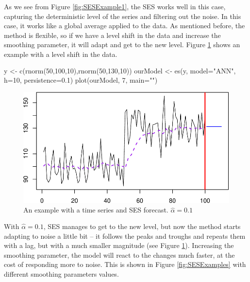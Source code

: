 \documentclass[
]{book}
\newenvironment{Shaded}{\begin{snugshade}}{\end{snugshade}}
\newcommand{\AttributeTok}[1]{\textcolor[rgb]{0.77,0.63,0.00}{#1}}
\newcommand{\DecValTok}[1]{\textcolor[rgb]{0.00,0.00,0.81}{#1}}
\newcommand{\FloatTok}[1]{\textcolor[rgb]{0.00,0.00,0.81}{#1}}
\newcommand{\FunctionTok}[1]{\textcolor[rgb]{0.00,0.00,0.00}{#1}}
\newcommand{\NormalTok}[1]{#1}
\newcommand{\OtherTok}[1]{\textcolor[rgb]{0.56,0.35,0.01}{#1}}
\newcommand{\StringTok}[1]{\textcolor[rgb]{0.31,0.60,0.02}{#1}}
\theoremstyle{definition}
\theoremstyle{definition}
\theoremstyle{definition}
\theoremstyle{definition}
\theoremstyle{remark}
\begin{document}
As we see from Figure \ref{fig:SESExample1}, the SES works well in this case, capturing the deterministic level of the series and filtering out the noise. In this case, it works like a global average applied to the data. As mentioned before, the method is flexible, so if we have a level shift in the data and increase the smoothing parameter, it will adapt and get to the new level. Figure \ref{fig:SESExample2} shows an example with a level shift in the data.

\begin{Shaded}
\begin{Highlighting}[]
\NormalTok{y }\OtherTok{\textless{}{-}} \FunctionTok{c}\NormalTok{(}\FunctionTok{rnorm}\NormalTok{(}\DecValTok{50}\NormalTok{,}\DecValTok{100}\NormalTok{,}\DecValTok{10}\NormalTok{),}\FunctionTok{rnorm}\NormalTok{(}\DecValTok{50}\NormalTok{,}\DecValTok{130}\NormalTok{,}\DecValTok{10}\NormalTok{))}
\NormalTok{ourModel }\OtherTok{\textless{}{-}} \FunctionTok{es}\NormalTok{(y, }\AttributeTok{model=}\StringTok{"ANN"}\NormalTok{, }\AttributeTok{h=}\DecValTok{10}\NormalTok{, }\AttributeTok{persistence=}\FloatTok{0.1}\NormalTok{)}
\FunctionTok{plot}\NormalTok{(ourModel, }\DecValTok{7}\NormalTok{, }\AttributeTok{main=}\StringTok{""}\NormalTok{)}
\end{Highlighting}
\end{Shaded}

\begin{figure}
\centering
\includegraphics{Svetunkov--2022----ADAM_files/figure-latex/SESExample2-1.pdf}
\caption{\label{fig:SESExample2}An example with a time series and SES forecast. \(\hat{\alpha}=0.1\)}
\end{figure}

With \(\hat{\alpha}=0.1\), SES manages to get to the new level, but now the method starts adapting to noise a little bit -- it follows the peaks and troughs and repeats them with a lag, but with a much smaller magnitude (see Figure \ref{fig:SESExample2}). Increasing the smoothing parameter, the model will react to the changes much faster, at the cost of responding more to noise. This is shown in Figure \ref{fig:SESExamples} with different smoothing parameters values.
\end{document}
